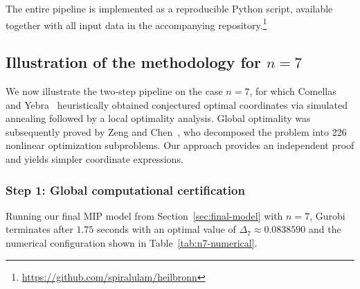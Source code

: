 \documentclass[11pt,a4paper]{article}
\theoremstyle{plain}
\theoremstyle{definition}
\theoremstyle{remark}
\begin{document}
The entire pipeline is implemented as a reproducible Python script, available together with all input data in the accompanying repository.\footnote{\url{https://github.com/spiralulam/heilbronn}}

  \subsection{Illustration of the methodology for $n=7$}
  \label{sec:illustration-n7}

  We now illustrate the two-step pipeline on the case $n=7$, for which
  Comellas and Yebra~\cite{comellasyebra2002} heuristically obtained conjectured optimal
  coordinates via simulated annealing followed by a local optimality analysis.
  Global optimality was subsequently proved by Zeng and Chen~\cite{ZengChen2011}, who decomposed the problem into 226 nonlinear optimization subproblems.
  Our approach provides an independent proof and yields simpler coordinate expressions.

  \subsubsection*{Step 1: Global computational certification}

  Running our final MIP model from Section~\ref{sec:final-model} with
  $n=7$, Gurobi terminates after $1.75$ seconds with an optimal value of $\Delta_7 \approx 0.0838590$ and
  the numerical configuration shown in
  Table~\ref{tab:n7-numerical}.
\end{document}
